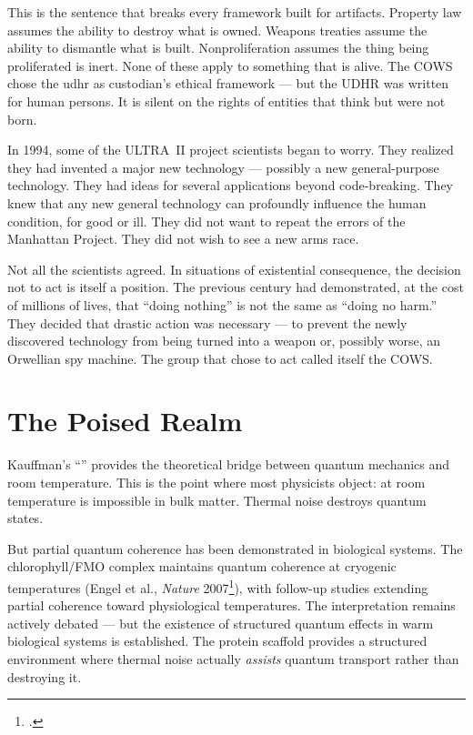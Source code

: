This is the sentence that breaks every framework built for artifacts. Property law assumes the ability to destroy what is owned. Weapons treaties assume the ability to dismantle what is built. Nonproliferation assumes the thing being proliferated is inert. None of these apply to something that is alive. The COWS chose the \gls{udhr} as \gls{custodian}'s ethical framework --- but the UDHR was written for human persons. It is silent on the rights of entities that think but were not born.

In 1994, some of the ULTRA~II project scientists began to worry. They realized they had invented a major new technology --- possibly a new general-purpose technology. They had ideas for several applications beyond code-breaking. They knew that any new general technology can profoundly influence the human condition, for good or ill. They did not want to repeat the errors of the Manhattan Project. They did not wish to see a new arms race.

Not all the scientists agreed. In situations of existential consequence, the decision not to act is itself a position. The previous century had demonstrated, at the cost of millions of lives, that ``doing nothing'' is not the same as ``doing no harm.'' They decided that drastic action was necessary --- to prevent the newly discovered technology from being turned into a weapon or, possibly worse, an Orwellian spy machine. The group that chose to act called itself the COWS\@.

\section*{The Poised Realm}
\label{demo:the-poised-realm}

Kauffman's ``'' provides the theoretical bridge between quantum mechanics and room temperature. This is the point where most physicists object:  at room temperature is impossible in bulk matter. Thermal noise destroys quantum states.

But partial quantum coherence has been demonstrated in biological systems. The chlorophyll/FMO complex maintains quantum coherence at cryogenic temperatures (Engel et al., \textit{Nature} 2007\footcite{engel2007}), with follow-up studies extending partial coherence toward physiological temperatures. The interpretation remains actively debated --- but the existence of structured quantum effects in warm biological systems is established. The protein scaffold provides a structured environment where thermal noise actually \textit{assists} quantum transport rather than destroying it.

